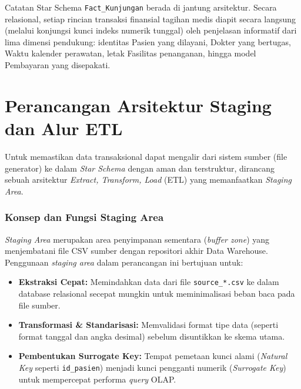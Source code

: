  
\begin{mybox}{Catatan Star Schema}
\texttt{Fact\_Kunjungan} berada di jantung arsitektur. Secara relasional, setiap rincian transaksi finansial tagihan medis diapit secara langsung (melalui konjungsi kunci indeks numerik tunggal) oleh penjelasan informatif dari lima dimensi pendukung: identitas Pasien yang dilayani, Dokter yang bertugas, Waktu kalender perawatan, letak Fasilitas penanganan, hingga model Pembayaran yang disepakati.
\end{mybox}
 
\section{Perancangan Arsitektur Staging dan Alur ETL}
 
Untuk memastikan data transaksional dapat mengalir dari sistem sumber (file generator) ke dalam \textit{Star Schema} dengan aman dan terstruktur, dirancang sebuah arsitektur \textit{Extract, Transform, Load} (ETL) yang memanfaatkan \textit{Staging Area}.
 
\subsubsection{Konsep dan Fungsi Staging Area}
 
\textit{Staging Area} merupakan area penyimpanan sementara (\textit{buffer zone}) yang menjembatani file CSV sumber dengan repositori akhir Data Warehouse. Penggunaan \textit{staging area} dalam perancangan ini bertujuan untuk:
 
\begin{itemize}
    \item \textbf{Ekstraksi Cepat:} Memindahkan data dari file \texttt{source\_*.csv} ke dalam database relasional secepat mungkin untuk meminimalisasi beban baca pada file sumber.
    \item \textbf{Transformasi \& Standarisasi:} Memvalidasi format tipe data (seperti format tanggal dan angka desimal) sebelum disuntikkan ke skema utama.
    \item \textbf{Pembentukan Surrogate Key:} Tempat pemetaan kunci alami (\textit{Natural Key} seperti \texttt{id\_pasien}) menjadi kunci pengganti numerik (\textit{Surrogate Key}) untuk mempercepat performa \textit{query} OLAP.
\end{itemize}
 
